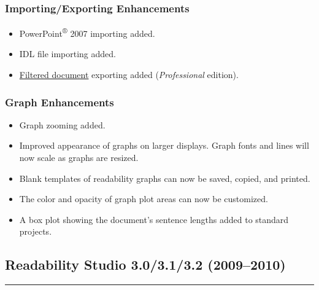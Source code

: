 \documentclass[
]{book}
\providecommand{\tightlist}{%
  \setlength{\itemsep}{0pt}\setlength{\parskip}{0pt}}
\theoremstyle{definition}
\theoremstyle{definition}
\theoremstyle{definition}
\theoremstyle{definition}
\theoremstyle{remark}
\begin{document}
\hypertarget{importingexporting-enhancements-3}{%
\subsubsection*{Importing/Exporting Enhancements}\label{importingexporting-enhancements-3}}

\begin{itemize}
\tightlist
\item
  PowerPoint\textsuperscript{®} 2007 importing added.
\item
  IDL file importing added.
\item
  \protect\hyperlink{filtering-export}{Filtered document} exporting added (\emph{Professional} edition).
\end{itemize}

\hypertarget{graph-enhancements-3}{%
\subsubsection*{Graph Enhancements}\label{graph-enhancements-3}}

\begin{itemize}
\tightlist
\item
  Graph zooming added.
\item
  Improved appearance of graphs on larger displays. Graph fonts and lines will now scale as graphs are resized.
\item
  Blank templates of readability graphs can now be saved, copied, and printed.
\item
  The color and opacity of graph plot areas can now be customized.
\item
  A box plot showing the document's sentence lengths added to standard projects.
\end{itemize}

\hypertarget{readability-studio-3.03.13.2-20092010}{%
\subsection*{Readability Studio 3.0/3.1/3.2 (2009--2010)}\label{readability-studio-3.03.13.2-20092010}}

\begin{center}\rule{0.5\linewidth}{0.5pt}\end{center}
\end{document}
